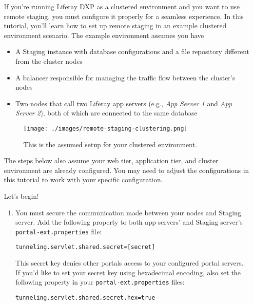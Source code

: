 If you're running Liferay DXP as a
\href{/docs/7-0/deploy/-/knowledge_base/d/liferay-clustering}{clustered
environment} and you want to use remote staging, you must configure it
properly for a seamless experience. In this tutorial, you'll learn how
to set up remote staging in an example clustered environment scenario.
The example environment assumes you have

\begin{itemize}
\tightlist
\item
  A Staging instance with database configurations and a file repository
  different from the cluster nodes
\item
  A balancer responsible for managing the traffic flow between the
  cluster's nodes
\item
  Two nodes that call two Liferay app servers (e.g., \emph{App Server 1}
  and \emph{App Server 2}), both of which are connected to the same
  database
\end{itemize}

\begin{figure}
\centering
\texttt{[image: ./images/remote-staging-clustering.png]}
\caption{This is the assumed setup for your clustered environment.}
\end{figure}

The steps below also assume your web tier, application tier, and cluster
environment are already configured. You may need to adjust the
configurations in this tutorial to work with your specific
configuration.

Let's begin!

\begin{enumerate}
\def\labelenumi{\arabic{enumi}.}
\item
  You must secure the communication made between your nodes and Staging
  server. Add the following property to both app servers' and Staging
  server's \texttt{portal-ext.properties} file:

\begin{verbatim}
tunneling.servlet.shared.secret=[secret]
\end{verbatim}

  This secret key denies other portals access to your configured portal
  servers. If you'd like to set your secret key using hexadecimal
  encoding, also set the following property in your
  \texttt{portal-ext.properties} files:

\begin{verbatim}
tunneling.servlet.shared.secret.hex=true
\end{verbatim}
\end{enumerate}

